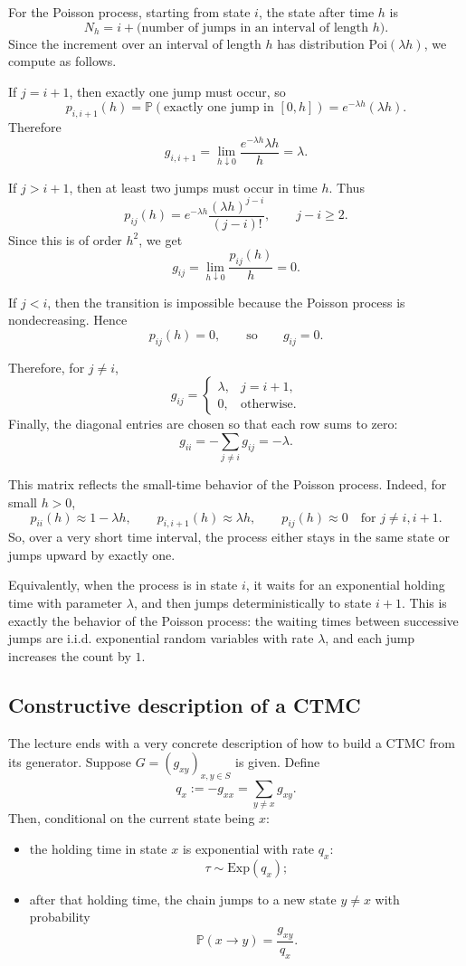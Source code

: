 \documentclass[11pt]{article}
\theoremstyle{definition}
\begin{document}
For the Poisson process, starting from state \(i\), the state after time \(h\) is
\[
N_h=i+\text{(number of jumps in an interval of length }h).
\]
Since the increment over an interval of length \(h\) has distribution \(\mathrm{Poi}(\lambda h)\), we compute as follows.

If \(j=i+1\), then exactly one jump must occur, so
\[
p_{i,i+1}(h)
=
\mathbb P(\text{exactly one jump in }[0,h])
=
e^{-\lambda h}(\lambda h).
\]
Therefore
\[
g_{i,i+1}
=
\lim_{h\downarrow 0}\frac{e^{-\lambda h}\lambda h}{h}
=
\lambda.
\]

If \(j>i+1\), then at least two jumps must occur in time \(h\). Thus
\[
p_{ij}(h)
=
e^{-\lambda h}\frac{(\lambda h)^{j-i}}{(j-i)!},
\qquad j-i\ge 2.
\]
Since this is of order \(h^2\), we get
\[
g_{ij}
=
\lim_{h\downarrow 0}\frac{p_{ij}(h)}{h}
=
0.
\]

If \(j<i\), then the transition is impossible because the Poisson process is nondecreasing. Hence
\[
p_{ij}(h)=0,
\qquad\text{so}\qquad
g_{ij}=0.
\]

Therefore, for \(j\neq i\),
\[
g_{ij}
=
\begin{cases}
\lambda, & j=i+1,\\[4pt]
0, & \text{otherwise}.
\end{cases}
\]
Finally, the diagonal entries are chosen so that each row sums to zero:
\[
g_{ii}
=
-\sum_{j\neq i}g_{ij}
=
-\lambda.
\]

This matrix reflects the small-time behavior of the Poisson process. Indeed, for small \(h>0\),
\[
p_{ii}(h)\approx 1-\lambda h,
\qquad
p_{i,i+1}(h)\approx \lambda h,
\qquad
p_{ij}(h)\approx 0 \quad \text{for } j\neq i,i+1.
\]
So, over a very short time interval, the process either stays in the same state or jumps upward by exactly one.

Equivalently, when the process is in state \(i\), it waits for an exponential holding time with parameter \(\lambda\), and then jumps deterministically to state \(i+1\). This is exactly the behavior of the Poisson process: the waiting times between successive jumps are i.i.d. exponential random variables with rate \(\lambda\), and each jump increases the count by \(1\).

\subsection{Constructive description of a CTMC}

The lecture ends with a very concrete description of how to build a CTMC from its generator.
Suppose $G=(g_{xy})_{x,y\in S}$ is given.
Define
\[
q_x:=-g_{xx}=\sum_{y\ne x} g_{xy}.
\]
Then, conditional on the current state being $x$:
\begin{itemize}[leftmargin=2em]
    \item the holding time in state $x$ is exponential with rate $q_x$:
    \[
    \tau\sim \mathrm{Exp}(q_x);
    \]
    \item after that holding time, the chain jumps to a new state $y\ne x$ with probability
    \[
    \mathbb P(x\to y)=\frac{g_{xy}}{q_x}.
    \]
\end{itemize}
\end{document}
